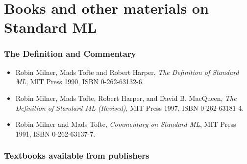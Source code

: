 \documentclass[fleqn]{article}
\begin{document}


\section{Books and other materials on Standard ML}
\label{sec-books}

\subsubsection*{The Definition and Commentary}

\begin{itemize}
\item Robin Milner, Mads Tofte and Robert Harper, {\em The Definition of
  Standard ML\/}, MIT Press 1990, ISBN 0-262-63132-6.  
\item Robin Milner, Mads Tofte, Robert Harper, and David B. MacQueen,
  {\em The Definition of Standard ML (Revised)\/}, MIT Press 1997,
  ISBN 0-262-63181-4.
\item Robin Milner and Mads Tofte, {\em Commentary on Standard ML\/},
  MIT Press 1991, ISBN 0-262-63137-7.
\end{itemize}

\subsubsection*{Textbooks available from publishers}
\end{document}
